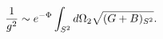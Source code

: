 \begin{equation}
{1\over g^2}\sim e^{-\Phi}\int_{S^2} d\Omega_2\sqrt{(G+B)_{S^2}}.\label{costanti}
\end{equation}

